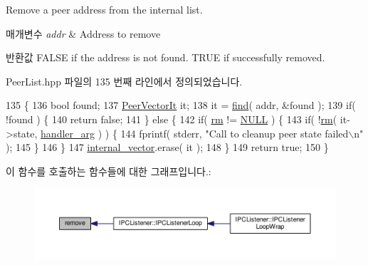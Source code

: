 Remove a peer address from the internal list. 


\begin{DoxyParams}{매개변수}
{\em addr} & Address to remove \\
\hline
\end{DoxyParams}
\begin{DoxyReturn}{반환값}
F\+A\+L\+SE if the address is not found. T\+R\+UE if successfully removed. 
\end{DoxyReturn}


Peer\+List.\+hpp 파일의 135 번째 라인에서 정의되었습니다.


\begin{DoxyCode}
135                                  \{
136         \textcolor{keywordtype}{bool} found;
137         \hyperlink{class_peer_list_a5113d4c4c744b83b83d1b4cc1aa5152a}{PeerVectorIt} it;
138         it = \hyperlink{class_peer_list_a3aa2d148cf848a5037abca6546a6125d}{find}( addr, &found );
139         \textcolor{keywordflow}{if}( !found ) \{
140             \textcolor{keywordflow}{return} \textcolor{keyword}{false};
141         \} \textcolor{keywordflow}{else} \{
142             \textcolor{keywordflow}{if}( \hyperlink{class_peer_list_a9958b92a85d1751a7bdfac8c5fd4ea96}{rm} != \hyperlink{openavb__types__base__pub_8h_a070d2ce7b6bb7e5c05602aa8c308d0c4}{NULL} ) \{
143                 \textcolor{keywordflow}{if}( !\hyperlink{class_peer_list_a9958b92a85d1751a7bdfac8c5fd4ea96}{rm}( it->state, \hyperlink{class_peer_list_aee326623b9b841369cb4766c195f570a}{handler\_arg} ) ) \{
144                     fprintf( stderr, \textcolor{stringliteral}{"Call to cleanup peer state failed\(\backslash\)n"} );
145                 \}
146             \}
147             \hyperlink{class_peer_list_af3621b78fcd5c27e1653da3e543f9438}{internal\_vector}.erase( it );
148         \}
149         \textcolor{keywordflow}{return} \textcolor{keyword}{true};
150     \}
\end{DoxyCode}


이 함수를 호출하는 함수들에 대한 그래프입니다.\+:
\nopagebreak
\begin{figure}[H]
\begin{center}
\leavevmode
\includegraphics[width=350pt]{class_peer_list_aecf651d7b2b4ad4974fb47624a64aee7_icgraph}
\end{center}
\end{figure}


